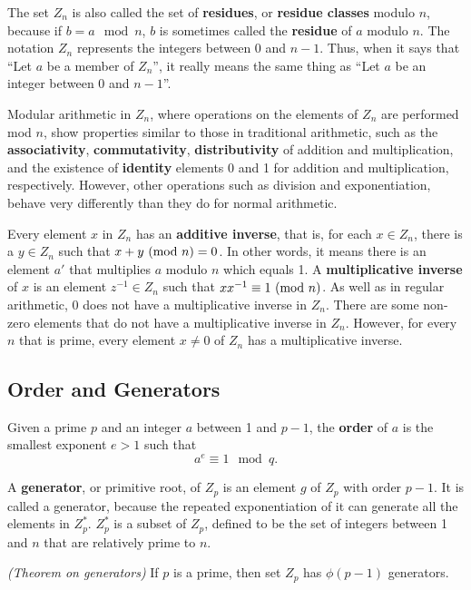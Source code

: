 The set $Z_{n}$ is also called the set of \textbf{residues}, or \textbf{residue classes} modulo $n$, because if $b=a \mod n$, $b$ is sometimes called the \textbf{residue} of $a$ modulo $n$. The notation $Z_{n}$ represents the integers between 0 and $n-1$. Thus, when it says that ``Let $a$ be a member of $Z_{n}$'', it really means the same thing as ``Let $a$ be an integer between 0 and $n-1$''.

Modular arithmetic in $Z_{n}$, where operations on the elements of $Z_{n}$ are performed mod $n$, show properties similar to those in traditional arithmetic, such as the \textbf{associativity}, \textbf{commutativity}, \textbf{distributivity} of addition and multiplication, and the existence of \textbf{identity} elements 0 and 1 for addition and multiplication, respectively. However, other operations such as division and exponentiation, behave very differently than they do for normal arithmetic. 

Every element $x$ in $Z_{n}$ has an \textbf{additive inverse}, that is, for each $x \in Z_{n}$, there is a $y \in Z_{n}$ such that $x + y \ (\text{mod}\ n) = 0$. In other words, it means there is an element $a'$ that multiplies $a$ modulo $n$ which equals 1.  A \textbf{multiplicative inverse} of $x$ is an element $z^{-1} \in Z_{n}$ such that $xx^{-1} \equiv 1 \ (\text{mod}\ n)$. As well as in regular arithmetic, 0 does not have a multiplicative inverse in $Z_{n}$. There are some non-zero elements that do not have a multiplicative inverse in $Z_{n}$. However, for every $n$ that is prime, every element $x \ne 0$ of $Z_{n}$ has a multiplicative inverse.

\subsection{Order and Generators}

Given a prime $p$ and an integer $a$ between 1 and $p-1$, the \textbf{order} of $a$ is the smallest exponent $e > 1 $ such that
\begin{equation}
  a^{e} \equiv 1 \mod q.
\end{equation}

A \textbf{generator}, or primitive root, of $Z_{p}$ is an element $g$ of $Z_{p}$ with order $p-1$. It is called a generator, because the repeated exponentiation of it can generate all the elements in $Z_{p}^{*}$. $Z_{p}^{*}$ is a subset of $Z_{p}$, defined to be the set of integers between 1 and $n$ that are relatively prime to $n$. 

\begin{theorem}
\emph{(Theorem on generators)}
If $p$ is a prime, then set $Z_{p}$ has $\phi(p-1)$ generators.
\end{theorem}


